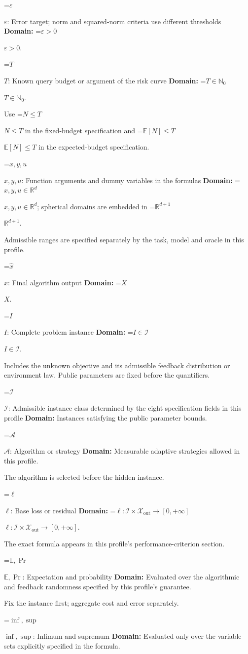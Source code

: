 \documentclass[10pt,a4paper]{article}
\newcommand{\AtlasMath}[1]{\par\begingroup\centering\setbox0=\hbox{$\displaystyle #1$}\ifdim\wd0>1.4\linewidth\typeout{ATLAS WIDE FORMULA: \the\wd0}\fi\ifdim\wd0>\linewidth\resizebox{\linewidth}{!}{\box0}\else\box0\fi\par\endgroup}
\newcommand{\AtlasInlineMath}[1]{\begingroup\setbox0=\hbox{$#1$}\ifdim\wd0>.4\linewidth\endgroup\AtlasMath{#1}\else\endgroup$#1$\fi}
\begin{document}
\AtlasInlineMath{\varepsilon}: Error target; norm and squared-norm criteria use different thresholds \textbf{Domain:} \AtlasInlineMath{\varepsilon>0}.

\AtlasInlineMath{T}: Known query budget or argument of the risk curve \textbf{Domain:} \AtlasInlineMath{T\in\mathbb{N}_0}.

Use \AtlasInlineMath{N\le T} in the fixed-budget specification and \AtlasInlineMath{\mathbb{E}[N]\le T} in the expected-budget specification.

\AtlasInlineMath{x,y,u}: Function arguments and dummy variables in the formulas \textbf{Domain:} \AtlasInlineMath{x,y,u\in\mathbb{R}^d}; spherical domains are embedded in \AtlasInlineMath{\mathbb{R}^{d+1}}.

Admissible ranges are specified separately by the task, model and oracle in this profile.

\AtlasInlineMath{\widehat{x}}: Final algorithm output \textbf{Domain:} \AtlasInlineMath{X}.

\AtlasInlineMath{I}: Complete problem instance \textbf{Domain:} \AtlasInlineMath{I\in\mathcal{I}}.

Includes the unknown objective and its admissible feedback distribution or environment law. Public parameters are fixed before the quantifiers.

\AtlasInlineMath{\mathcal{I}}: Admissible instance class determined by the eight specification fields in this profile \textbf{Domain:} Instances satisfying the public parameter bounds.

\AtlasInlineMath{\mathcal{A}}: Algorithm or strategy \textbf{Domain:} Measurable adaptive strategies allowed in this profile.

The algorithm is selected before the hidden instance.

\AtlasInlineMath{\ell}: Base loss or residual \textbf{Domain:} \AtlasInlineMath{\ell:\mathcal{I}\times\mathcal{X}_{\mathrm{out}}\to[0,+\infty]}.

The exact formula appears in this profile's performance-criterion section.

\AtlasInlineMath{\mathbb{E},\Pr}: Expectation and probability \textbf{Domain:} Evaluated over the algorithmic and feedback randomness specified by this profile's guarantee.

Fix the instance first; aggregate cost and error separately.

\AtlasInlineMath{\inf,\sup}: Infimum and supremum \textbf{Domain:} Evaluated only over the variable sets explicitly specified in the formula.
\end{document}
